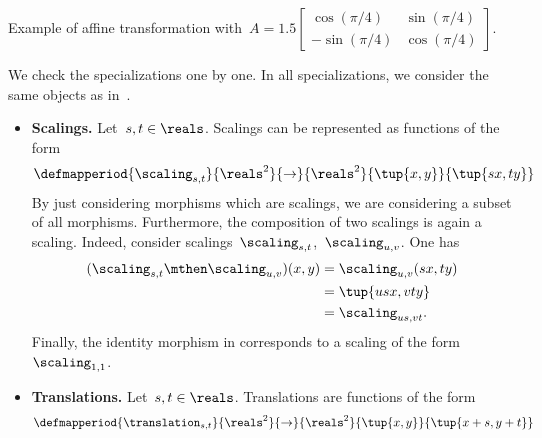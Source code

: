 \begin{solution}
    \begin{marginfigure}
        \begin{center}
        \end{center}
        \caption{Example of affine transformation with~$A=1.5\begin{bmatrix}\cos(\pi/4)&\sin(\pi/4)\\-\sin(\pi/4)&\cos(\pi/4)\end{bmatrix}$.}
    \end{marginfigure}
    We check the specializations one by one.
    In all specializations, we consider the same objects as in~\Draw.
    \begin{itemize}
        \item \textbf{Scalings.}
              Let~$s,t\in \reals$.
              Scalings can be represented as functions of the form
              \begin{equation*}
                  \defmapperiod{\scaling_{s,t}}{\reals^2}{\to}{\reals^2}{\tup{x,y}}{\tup{s x,t y}}
              \end{equation*}
              By just considering morphisms which are scalings, we are considering a subset of all morphisms.
              Furthermore, the composition of two scalings is again a scaling.
              Indeed, consider scalings~$\scaling_{s,t}$,~$\scaling_{u,v}$.
              One has
              \begin{equation*}
                  \begin{aligned}
                      (\scaling_{s,t}\mthen \scaling_{u,v})(x,y) & =\scaling_{u,v}(sx, ty) \\
                                                                 & =\tup{usx, vty} \\
                                                                 & =\scaling_{us,vt}.
                  \end{aligned}
              \end{equation*}
              Finally, the identity morphism in \Draw corresponds to a scaling of the form~$\scaling_{1,1}$.
        \item \textbf{Translations.}
              Let~$s,t\in \reals$.
              Translations are functions of the form
              \begin{equation*}
                  \defmapperiod{\translation_{s,t}}{\reals^2}{\to}{\reals^2}{\tup{x,y}}{\tup{x+s,y+t}}

\end{equation*}
\end{itemize}
\end{solution}

